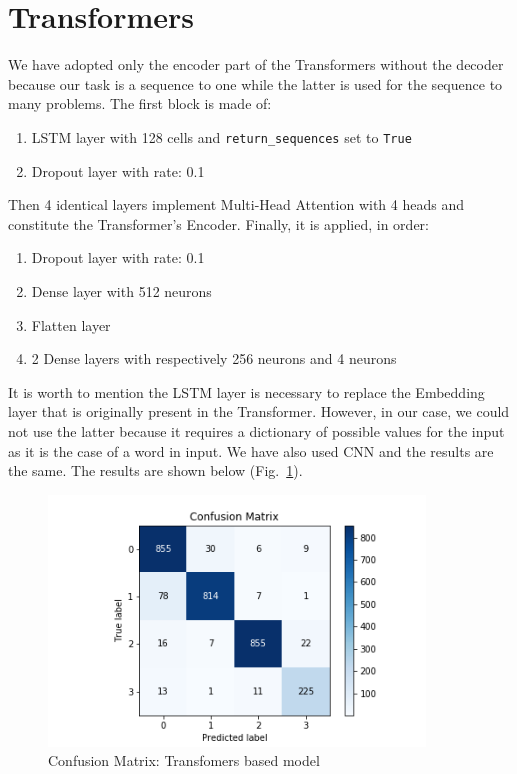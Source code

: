 \documentclass[LaM,binding=0.6cm]{sapthesis}
\begin{document}
\section{Transformers}
We have adopted only the encoder part of the Transformers without the decoder because our task is a sequence to one while the latter is used for the sequence to many problems. The first block is made of:
\begin{enumerate}
\item LSTM layer with 128 cells and \texttt{return\_sequences} set to \texttt{True}
\item Dropout layer with rate: 0.1
\end{enumerate}
Then 4 identical layers implement Multi-Head Attention with 4 heads and constitute the Transformer's Encoder. Finally, it is applied, in order:
\begin{enumerate}
\item Dropout layer with rate: 0.1
\item Dense layer with 512 neurons
\item Flatten layer
\item 2 Dense layers with respectively 256 neurons and 4 neurons
\end{enumerate}
It is worth to mention the LSTM layer is necessary to replace the Embedding layer that is originally present in the Transformer. However, in our case, we could not use the latter because it requires a dictionary of possible values for the input as it is the case of a word in input. We have also used CNN and the results are the same.
The results are shown below (Fig.~\ref{fig:transf}).
\begin{figure}  \centering
    \includegraphics[width=100mm,scale=0.7]{transf}
    \caption{Confusion Matrix: Transfomers based model }
    \label{fig:transf}
\end{figure}
\end{document}
